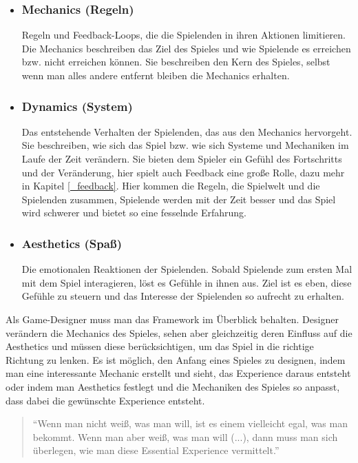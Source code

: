 \begin{itemize}
\item\subsubsection{Mechanics (Regeln)}

Regeln und Feedback-Loops, die die Spielenden in ihren Aktionen limitieren. Die Mechanics beschreiben das Ziel des Spieles und wie Spielende es erreichen bzw. nicht erreichen können\cite[S.96]{_art_of_gamedesign}. Sie beschreiben den Kern des Spieles, selbst wenn man alles andere entfernt bleiben die Mechanics erhalten\cite[S.231]{_art_of_gamedesign}.
 
\item\subsubsection{Dynamics (System)}

Das entstehende Verhalten der Spielenden, das aus den Mechanics hervorgeht\cite{_mda}. Sie beschreiben, wie sich das Spiel bzw. wie sich Systeme und Mechaniken im Laufe der Zeit verändern. Sie bieten dem Spieler ein Gefühl des Fortschritts und der Veränderung, hier spielt auch Feedback eine große Rolle, dazu mehr in Kapitel \ref{_feedback}. Hier kommen die Regeln, die Spielwelt und die Spielenden zusammen, Spielende werden mit der Zeit besser und das Spiel wird schwerer und bietet so eine fesselnde Erfahrung.

\item\subsubsection{Aesthetics (Spaß)}

Die emotionalen Reaktionen der Spielenden. Sobald Spielende zum ersten Mal mit dem Spiel interagieren, löst es Gefühle in ihnen aus. Ziel ist es eben, diese Gefühle zu steuern und das Interesse der Spielenden so aufrecht zu erhalten.\newline
\end{itemize}

\noindent Als Game-Designer muss man das Framework im Überblick behalten. Designer verändern die Mechanics des Spieles, sehen aber gleichzeitig deren Einfluss auf die Aesthetics und müssen diese berücksichtigen, um das Spiel in die richtige Richtung zu lenken. Es ist möglich, den Anfang eines Spieles zu designen, indem man eine interessante Mechanic erstellt und sieht, das Experience daraus entsteht oder indem man Aesthetics festlegt und die Mechaniken des Spieles so anpasst, dass dabei die gewünschte Experience entsteht. \begin{quote}"`Wenn man nicht weiß, was man will, ist es einem vielleicht egal, was man bekommt. Wenn man aber weiß, was man will (...), dann muss man sich überlegen, wie man diese Essential Experience vermittelt."'\cite[S.55]{_art_of_gamedesign}\end{quote}

